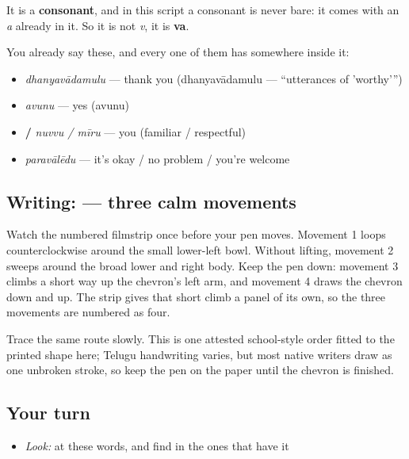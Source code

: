 It is a \textbf{consonant}, and in this script a consonant is never bare: it comes with an \emph{a} already in it. So it is not \emph{v}, it is \textbf{va}.

You already say these, and every one of them has  somewhere inside it:

\begin{itemize}
\raggedright
  \item \textbf{} \emph{dhanyavādamulu} — thank you (dhanyavādamulu — \textquotedblleft{}utterances of 'worthy'\textquotedblright{})
  \item \textbf{} \emph{avunu} — yes (avunu)
  \item \textbf{ / } \emph{nuvvu / mīru} — you (familiar / respectful)
  \item \textbf{} \emph{paravālēdu} — it's okay / no problem / you're welcome
\end{itemize}

\subsection*{Writing:  — three calm movements}

Watch the numbered filmstrip once before your pen moves. Movement 1 loops counterclockwise around the small lower-left bowl. Without lifting, movement 2 sweeps around the broad lower and right body. Keep the pen down: movement 3 climbs a short way up the chevron's left arm, and movement 4 draws the chevron down and up. The strip gives that short climb a panel of its own, so the three movements are numbered as four.

Trace the same route slowly. This is one attested school-style order fitted to the printed shape here; Telugu handwriting varies, but most native writers draw  as one unbroken stroke, so keep the pen on the paper until the chevron is finished.

\subsection*{Your turn}
\begin{itemize}
\raggedright
  \item \emph{Look:} at these words, and find  in the ones that have it
\end{itemize}


